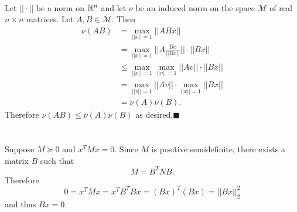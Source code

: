 \documentclass[letterpaper,12pt,oneside,onecolumn]{article}
\newcommand{\cM}{\mathcal{M}} \newcommand{\cN}{\mathcal{N}}
\begin{document}
\paragraph{}
Let $|| \cdot ||$ be a norm on $\mathbb{R}^n$ and let $\nu$ be an induced norm on the space $\cM$ of real $n \times n$ matrices. Let $A, B \in \cM$. Then
\begin{align*}
\nu(AB) &= \max_{||x|| = 1} ||ABx|| \\
&= \max_{||x|| = 1} ||A\frac{Bx}{||Bx||}||\cdot ||Bx||\\
&\leq \max_{||x|| = 1} \max_{||v|| = 1} ||Av|| \cdot ||Bx||\\
&= \max_{||v|| =1} ||Av||\cdot \max_{||x|| = 1} ||Bx|| \\
&=\nu(A) \nu(B).
\end{align*}
Therefore $\nu(AB) \leq \nu(A) \nu(B)$ as desired.$\blacksquare$

\section{}
\paragraph{}
Suppose $M \succcurlyeq 0$ and $x^TMx=0$. Since $M$ is positive semidefinite, there exists a matrix $B$ such that
$$M = B^TNB.$$
Therefore $$0 = x^TMx = x^TB^TBx = (Bx)^T(Bx) = ||Bx||_2^2$$
and thus $Bx = 0$.
\end{document}
